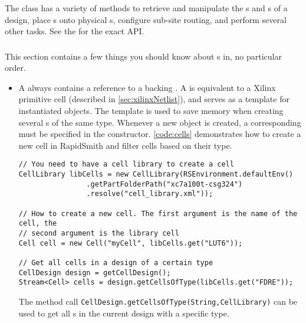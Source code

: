 \noindent
The  class has a variety of methods to retrieve and manipulate
the s and s of a design, place s onto
physical s, configure sub-site routing, and perform several other
tasks. See the
\href{https://github.com/byuccl/RapidSmith2}{\color{blue}{Javadocs}} for the
exact API.
 
\subsubsection{}
This section contains a few things you should know about s in, no
particular order.

\begin {itemize}
  \item A  always contains a reference to a backing .
  A  is equivalent to a Xilinx primitive cell (described in
  \autoref{sec:xilinxNetlist}), and serves as a template for instantiated
   objects. The template is used to save memory when creating several
  s of the same type. Whenever a new  object is created, a
  corresponding  must be specified in the constructor.
  \autoref{code:cells} demonstrates how to create a new cell in RapidSmith and
  filter cells based on their type.
  
\begin{lstlisting}[caption=How to create new cells in RapidSmith,
label=code:cells] 
// You need to have a cell library to create a cell
CellLibrary libCells = new CellLibrary(RSEnvironment.defaultEnv()
				.getPartFolderPath("xc7a100t-csg324")
				.resolve("cell_library.xml"));

// How to create a new cell. The first argument is the name of the cell, the
// second argument is the library cell
Cell cell = new Cell("myCell", libCells.get("LUT6"));

// Get all cells in a design of a certain type
CellDesign design = getCellDesign();
Stream<Cell> cells = design.getCellsOfType(libCells.get("FDRE"));
\end{lstlisting}

  The method call \texttt{CellDesign.getCellsOfType(String,CellLibrary)} can be
  used to get all s in the current design with a specific
   type.
  

\end{itemize}
